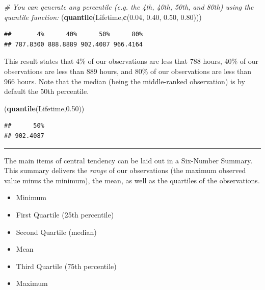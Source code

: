 \documentclass[
]{book}
\newenvironment{Shaded}{\begin{snugshade}}{\end{snugshade}}
\newcommand{\CommentTok}[1]{\textcolor[rgb]{0.56,0.35,0.01}{\textit{#1}}}
\newcommand{\FloatTok}[1]{\textcolor[rgb]{0.00,0.00,0.81}{#1}}
\newcommand{\FunctionTok}[1]{\textcolor[rgb]{0.13,0.29,0.53}{\textbf{#1}}}
\newcommand{\NormalTok}[1]{#1}
\providecommand{\tightlist}{%
  \setlength{\itemsep}{0pt}\setlength{\parskip}{0pt}}
\begin{document}
\begin{Shaded}
\begin{Highlighting}[]
\CommentTok{\# You can generate any percentile (e.g. the 4th, 40th, 50th, and 80th) using the quantile function:}
\NormalTok{(}\FunctionTok{quantile}\NormalTok{(Lifetime,}\FunctionTok{c}\NormalTok{(}\FloatTok{0.04}\NormalTok{, }\FloatTok{0.40}\NormalTok{, }\FloatTok{0.50}\NormalTok{, }\FloatTok{0.80}\NormalTok{)))}
\end{Highlighting}
\end{Shaded}

\begin{verbatim}
##       4%      40%      50%      80% 
## 787.8300 888.8889 902.4087 966.4164
\end{verbatim}

This result states that 4\% of our observations are less that 788 hours, 40\% of our observations are less than 889 hours, and 80\% of our observations are less than 966 hours. Note that the median (being the middle-ranked observation) is by default the 50th percentile.

\begin{Shaded}
\begin{Highlighting}[]
\NormalTok{(}\FunctionTok{quantile}\NormalTok{(Lifetime,}\FloatTok{0.50}\NormalTok{))}
\end{Highlighting}
\end{Shaded}

\begin{verbatim}
##      50% 
## 902.4087
\end{verbatim}

\begin{center}\rule{0.5\linewidth}{0.5pt}\end{center}

The main items of central tendency can be laid out in a Six-Number Summary. This summary delivers the \emph{range} of our observations (the maximum observed value minus the minimum), the mean, as well as the quartiles of the observations.

\begin{itemize}
\tightlist
\item
  Minimum
\item
  First Quartile (25th percentile)
\item
  Second Quartile (median)
\item
  Mean
\item
  Third Quartile (75th percentile)
\item
  Maximum
\end{itemize}
\end{document}
